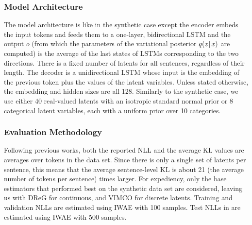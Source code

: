 \subsubsection{Model Architecture}

The model architecture is like in the synthetic case except the encoder embeds the input tokens and feeds them to a one-layer, bidirectional LSTM \citep{hochreiter1997long} and the output $o$ (from which the parameters of the variational posterior $q(z\hspace{0.08em}|\hspace{0.11em} x)$ are computed) is the average of the last states of LSTMs corresponding to the two directions.
There is a fixed number of latents for all sentences, regardless of their length.
The decoder is a unidirectional LSTM whose input is the embedding of the previous token plus the values of the latent variables.
Unless stated otherwise, the embedding and hidden sizes are all 128.
Similarly to the synthetic case, we use either 40 real-valued latents with an isotropic standard normal prior or 8 categorical latent variables, each with a uniform prior over 10 categories.

\subsubsection{Evaluation Methodology}

Following previous works, both the reported NLL and the average KL values are averages over tokens in the data set.
Since there is only a single set of latents per sentence, this means that the average sentence-level KL is about 21 (the average number of tokens per sentence) times larger.
For expediency, only the base estimators that performed best on the synthetic data set are considered, leaving us with DReG for continuous, and VIMCO for discrete latents.
Training and validation NLLs are estimated using IWAE with 100 samples.
Test NLLs in  are estimated using IWAE with 500 samples.

